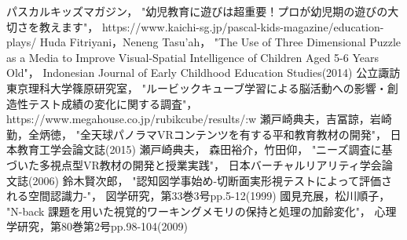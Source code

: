 \begin{thebibliography}{9}
    パスカルキッズマガジン，
    "幼児教育に遊びは超重要！プロが幼児期の遊びの大切さを教えます"，
    https://www.kaichi-sg.jp/pascal-kids-magazine/education-plays/
    Huda Fitriyani，Neneng Tasu’ah，
    "The Use of Three Dimensional Puzzle as a Media to Improve Visual-Spatial Intelligence of Children Aged 5-6 Years Old"，
    Indonesian Journal of Early Childhood Education Studies(2014)
    公立諏訪東京理科大学篠原研究室，
    "ルービックキューブ学習による脳活動への影響・創造性テスト成績の変化に関する調査"，
    https://www.megahouse.co.jp/rubikcube/results/:w
    瀬戸崎典夫，吉冨諒，岩崎勤，全炳徳，
    "全天球パノラマVRコンテンツを有する平和教育教材の開発"，
    日本教育工学会論文誌(2015)
    瀬戸崎典夫， 森田裕介，竹田仰，
    "ニーズ調査に基づいた多視点型VR教材の開発と授業実践"，
    日本バーチャルリアリティ学会論文誌(2006)
    鈴木賢次郎，
    "認知図学事始め-切断面実形視テストによって評価される空間認識力-"，
    図学研究，第33巻3号pp.5-12(1999)
    國見充展，松川順子，
    "N-back 課題を用いた視覚的ワーキングメモリの保持と処理の加齢変化"，
    心理学研究，第80巻第2号pp.98-104(2009)
\end{thebibliography}

